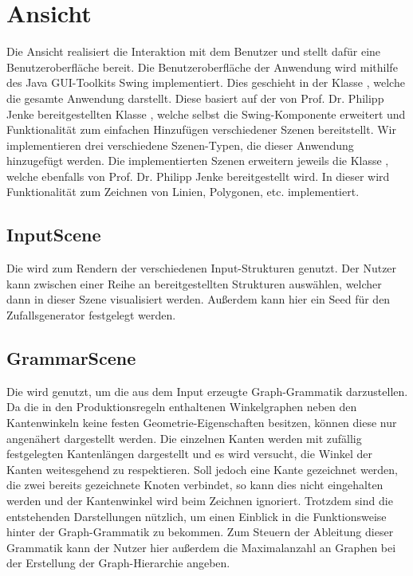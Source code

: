 \section{Ansicht}
Die Ansicht realisiert die Interaktion mit dem Benutzer und stellt dafür eine Benutzeroberfläche bereit.
Die Benutzeroberfläche der Anwendung wird mithilfe des Java GUI-Toolkits Swing implementiert. Dies geschieht in der Klasse
, welche die gesamte Anwendung darstellt. Diese basiert auf der von Prof. Dr. Philipp Jenke bereitgestellten
Klasse , welche selbst die Swing-Komponente  erweitert und
Funktionalität zum einfachen Hinzufügen verschiedener Szenen bereitstellt. Wir implementieren drei verschiedene Szenen-Typen,
die dieser Anwendung hinzugefügt werden. Die implementierten Szenen erweitern jeweils die Klasse , welche ebenfalls
von Prof. Dr. Philipp Jenke bereitgestellt wird. In dieser wird Funktionalität zum Zeichnen von Linien, Polygonen, etc. implementiert.

\subsection{InputScene}
Die  wird zum Rendern der verschiedenen Input-Strukturen genutzt. Der Nutzer kann zwischen
einer Reihe an bereitgestellten Strukturen auswählen, welcher dann in dieser Szene visualisiert werden. Außerdem kann hier ein
Seed für den Zufallsgenerator festgelegt werden.

\subsection{GrammarScene}
Die  wird genutzt, um die aus dem Input erzeugte Graph-Grammatik darzustellen. Da die in den
Produktionsregeln enthaltenen Winkelgraphen neben den Kantenwinkeln keine festen Geometrie-Eigenschaften besitzen, können diese nur
angenähert dargestellt werden. Die einzelnen Kanten werden mit zufällig festgelegten Kantenlängen dargestellt und es wird versucht, die
Winkel der Kanten weitesgehend zu respektieren. Soll jedoch eine Kante gezeichnet werden, die zwei bereits gezeichnete Knoten verbindet,
so kann dies nicht eingehalten werden und der Kantenwinkel wird beim Zeichnen ignoriert. Trotzdem sind die entstehenden Darstellungen
nützlich, um einen Einblick in die Funktionsweise hinter der Graph-Grammatik zu bekommen. Zum Steuern der Ableitung dieser Grammatik
kann der Nutzer hier außerdem die Maximalanzahl an Graphen bei der Erstellung der Graph-Hierarchie angeben.

